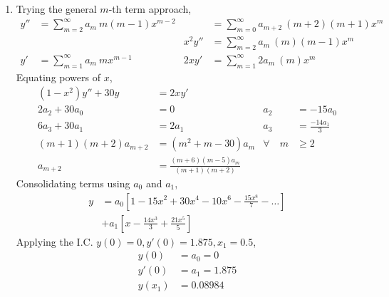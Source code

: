 \begin{enumerate}
    \item Trying the general $ m $-th term approach,
          \begin{align}
              y''    & = \sum_{m=2}^{\infty}a_m\ m(m-1)x^{m-2}     &
                     & = \sum_{m=0}^{\infty}a_{m+2}\ (m+2)(m+1)x^m   \\
                     &                                             &
              x^2y'' & = \sum_{m=2}^{\infty}a_{m}\ (m)(m-1)x^m       \\
              y'     & = \sum_{m=1}^{\infty}a_m\ mx^{m-1}          &
              2xy'   & = \sum_{m = 1}^{\infty}2a_{m}\ (m)x^m
          \end{align}
          Equating powers of $ x $,
          \begin{align}
              (1-x^2)y'' + 30y  & = 2xy'                               \\
              2a_2 + 30a_0      & = 0                                &
              a_2               & = -15a_0                             \\
              6a_3 + 30a_1      & = 2a_1                             &
              a_3               & = \frac{-14a_1}{3}                   \\
              (m+1)(m+2)a_{m+2} & = (m^2 + m - 30)a_m                &
              \forall \quad m   & \geq 2                               \\
              a_{m+2}           & = \frac{(m+6)(m-5)a_m}{(m+1)(m+2)}
          \end{align}
          Consolidating terms using $ a_0 $ and $a_1$,
          \begin{align}
              y & = a_0 \left[1 - 15x^2 + 30x^4 - 10x^6
              - \frac{15x^8}{7} - \dots \right]                      \\
                & + a_1 \left[ x - \frac{14x^3}{3} + \frac{21x^5}{5}
                  \right]
          \end{align}
          Applying the I.C. $y(0) = 0, y'(0) = 1.875, x_1 = 0.5$,
          \begin{align}
              y(0)   & = a_0 = 0     \\
              y'(0)  & = a_1 = 1.875 \\
              y(x_1) & = 0.08984
          \end{align}
          \begin{figure}[H]
              \centering
              \begin{tikzpicture}

\end{tikzpicture}
\end{figure}
\end{enumerate}
